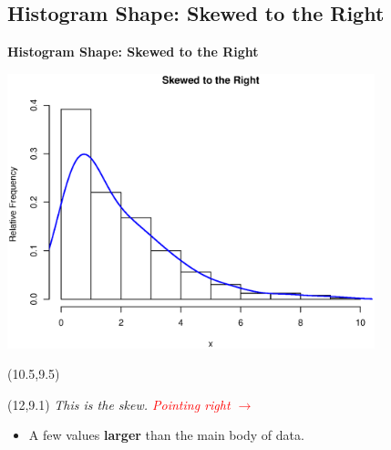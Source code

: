 \documentclass[compress]{beamer}        %
\makeatletter
\newcommand{\tcb}{\textcolor{beamer@blendedblue}}
\newcommand{\tcr}{\textcolor{red}}
\makeatother
\begin{document}
\subsection{Histogram Shape: Skewed to the Right}
\begin{frame}{\bf \tcb{Histogram Shape: Skewed to the Right}\\[-1.1cm]}
\begin{center}
\includegraphics[width=0.8\textwidth, trim = 0.0cm 0.5cm 0.3cm 1.5cm, clip]{SkewRight}
\end{center}
\begin{textblock}{1}(10.5,9.5)
\xymatrixrowsep{0.5cm}
\end{textblock}
\begin{textblock}{4}(12,9.1)
{\footnotesize\emph{This is the skew. \tcr{Pointing right {\boldmath$\rightarrow$}}}}
\end{textblock}
\begin{itemize}
\item A few values {\bf larger} than the main body of data.
\end{itemize}
\end{frame}
\end{document}
